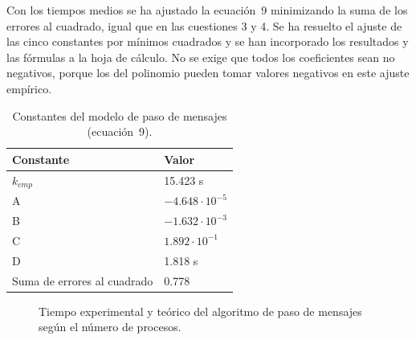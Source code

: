 \documentclass[12pt]{article}
\begin{document}
\begin{enumerate}
Con los tiempos medios se ha ajustado la ecuación~9 minimizando la suma de los errores al cuadrado, igual que en las cuestiones 3 y 4. Se ha resuelto el ajuste de las cinco constantes por mínimos cuadrados y se han incorporado los resultados y las fórmulas a la hoja de cálculo. No se exige que todos los coeficientes sean no negativos, porque los del polinomio pueden tomar valores negativos en este ajuste empírico.

\begin{table}[htbp]
\centering
\begin{tabular}{ll}
\toprule
\textbf{Constante} & \textbf{Valor} \\
\midrule
$k_{cmp}$ & 15.423 s \\
A & $-4.648 \cdot 10^{-5}$ \\
B & $-1.632 \cdot 10^{-3}$ \\
C & $1.892 \cdot 10^{-1}$ \\
D & 1.818 s \\
Suma de errores al cuadrado & 0.778 \\
\bottomrule
\end{tabular}
\caption{Constantes del modelo de paso de mensajes (ecuación~9).}
\label{tab:c5_constantes}
\end{table}

\begin{figure}[htbp]
\centering
{}
\caption{Tiempo experimental y teórico del algoritmo de paso de mensajes según el número de procesos.}
\label{fig:c5_ajuste}
\end{figure}


\end{enumerate}
\end{document}
